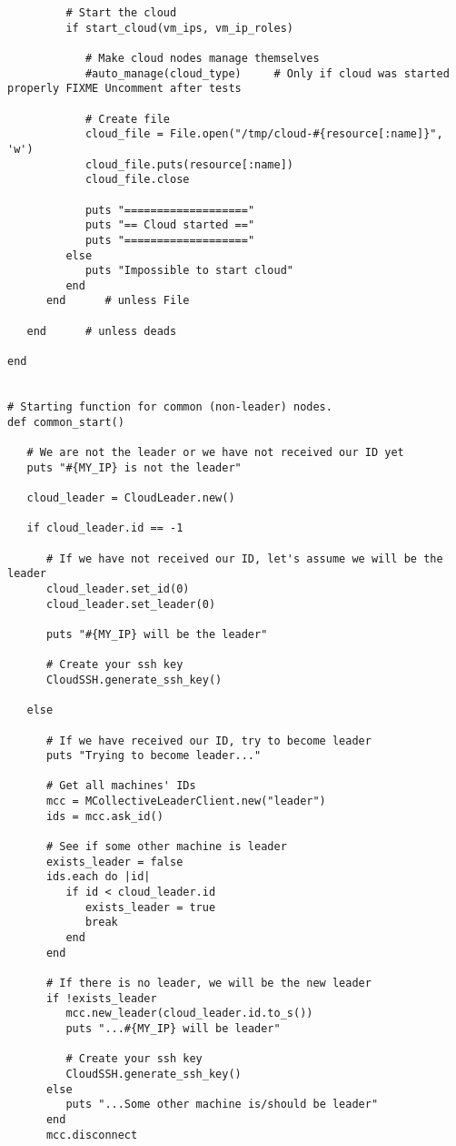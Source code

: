 \begin{lstlisting}
         # Start the cloud
         if start_cloud(vm_ips, vm_ip_roles)
            
            # Make cloud nodes manage themselves
            #auto_manage(cloud_type)     # Only if cloud was started properly FIXME Uncomment after tests
            
            # Create file
            cloud_file = File.open("/tmp/cloud-#{resource[:name]}", 'w')
            cloud_file.puts(resource[:name])
            cloud_file.close
            
            puts "==================="
            puts "== Cloud started =="
            puts "==================="
         else
            puts "Impossible to start cloud"
         end
      end      # unless File
      
   end      # unless deads

end


# Starting function for common (non-leader) nodes.
def common_start()

   # We are not the leader or we have not received our ID yet
   puts "#{MY_IP} is not the leader"
   
   cloud_leader = CloudLeader.new()
   
   if cloud_leader.id == -1
      
      # If we have not received our ID, let's assume we will be the leader
      cloud_leader.set_id(0)
      cloud_leader.set_leader(0)
      
      puts "#{MY_IP} will be the leader"
      
      # Create your ssh key
      CloudSSH.generate_ssh_key()
      
   else
      
      # If we have received our ID, try to become leader
      puts "Trying to become leader..."
      
      # Get all machines' IDs
      mcc = MCollectiveLeaderClient.new("leader")
      ids = mcc.ask_id()
      
      # See if some other machine is leader
      exists_leader = false
      ids.each do |id|
         if id < cloud_leader.id
            exists_leader = true 
            break
         end
      end
      
      # If there is no leader, we will be the new leader
      if !exists_leader
         mcc.new_leader(cloud_leader.id.to_s())
         puts "...#{MY_IP} will be leader"
         
         # Create your ssh key
         CloudSSH.generate_ssh_key()
      else
         puts "...Some other machine is/should be leader"
      end
      mcc.disconnect
      

\end{lstlisting}
